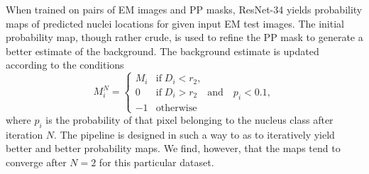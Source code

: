 When trained on pairs of EM images and PP masks, ResNet-34 yields probability maps of predicted nuclei locations for given input EM test images. The initial probability map, though rather crude, is used to refine the PP mask to generate a better estimate of the background. The background estimate is updated according to the conditions
%
\begin{equation}
    M^N_i = 
    \begin{cases}
        M_i & \text{if}\; D_i < r_2, \\
        0 & \text{if}\; D_i > r_2 \quad \text{and} \quad p_i < 0.1, \\
        -1 & \text{otherwise}
    \end{cases}
\end{equation}
%
where $p_i$ is the probability of that pixel belonging to the nucleus class after iteration $N$. The pipeline is designed in such a way to as to iteratively yield better and better probability maps. We find, however, that the maps tend to converge after $N=\text{2}$ for this particular dataset.

